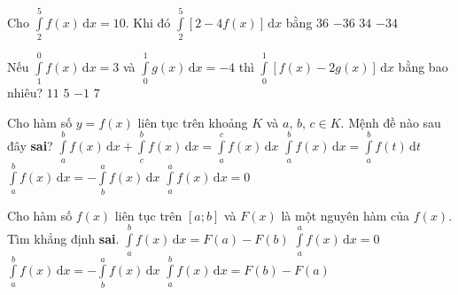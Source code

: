 \begin{ex}%
	Cho $\displaystyle\int\limits_2^5 f(x)\mathrm{\,d}x = 10$. Khi đó $\displaystyle\int\limits_2^5 \left[2 - 4f(x)\right]\mathrm{\,d}x$ bằng
	\choice
	{$36$}
	{$-36$}
	{$34$}
	{\True $-34$}
\end{ex}
\begin{ex}%
	Nếu $\displaystyle\int\limits_1^0 f(x)\mathrm{\,d}x = 3$ và $\displaystyle\int\limits_0^1 g(x) \mathrm{\,d}x = -4$ thì $\displaystyle\int\limits_0^1 \left[f(x) - 2g(x)\right] \mathrm{\,d}x$ bằng bao nhiêu?
	\choice
	{ $11$}
	{\True $5$}
	{ $-1$}
	{ $7$}
\end{ex}
\begin{ex}%
	Cho hàm số $y = f(x)$ liên tục trên khoảng $K$ và $a$, $b$, $c \in K$. Mệnh đề nào sau đây \textbf{sai}?
	\choice
	{\True $\displaystyle\int\limits_a^b f(x)\mathrm{\,d}x + \displaystyle\int\limits_c^b f(x)\mathrm{\,d}x = \displaystyle\int\limits_a^c f(x)\mathrm{\,d}x$}
	{$\displaystyle\int\limits_a^b f(x)\mathrm{\,d}x = \displaystyle\int\limits_a^b f(t)\mathrm{\,d}t$}
	{$\displaystyle\int\limits_a^b f(x)\mathrm{\,d}x = -\displaystyle\int\limits_b^a f(x)\mathrm{\,d}x$}
	{$\displaystyle\int\limits_a^a f(x)\mathrm{\,d}x = 0$}
\end{ex}
\begin{ex}%
	Cho hàm số $f(x)$ liên tục trên $[a; b]$ và $F(x)$ là một nguyên hàm của $f(x)$. Tìm khẳng định \textbf{sai}.
	\choice
	{\True $\displaystyle\int\limits_a^b f(x)\mathrm{\,d}x = F(a) - F(b)$}
	{$\displaystyle\int\limits_a^a f(x)\mathrm{\,d}x = 0$}
	{$\displaystyle\int\limits_a^b f(x)\mathrm{\,d}x = -\displaystyle\int\limits_b^a f(x)\mathrm{\,d}x$}
	{$\displaystyle\int\limits_a^b f(x)\mathrm{\,d}x = F(b) - F(a)$}
\end{ex}
